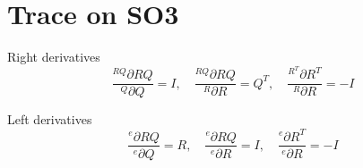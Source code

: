 \section{Trace on SO3}


\begin{tcolorbox}[title=Example: Left and right derivatives on SO(3)]

  Right derivatives
  \begin{equation}
    \frac{^{RQ}\partial R Q}{^Q\partial Q} = I, \quad \frac{^{RQ}\partial R Q}{^R\partial R} = Q^T, \quad \frac{^{R^T}\partial R^T}{^R\partial R} = -I
  \end{equation}

  Left derivatives
  \begin{equation}
    \frac{^{e}\partial R Q}{^e\partial Q} = R, \quad \frac{^{e}\partial R Q}{^e\partial R} = I, \quad \frac{^{e}\partial R^T}{^e\partial R} = -I
  \end{equation}

\end{tcolorbox}

